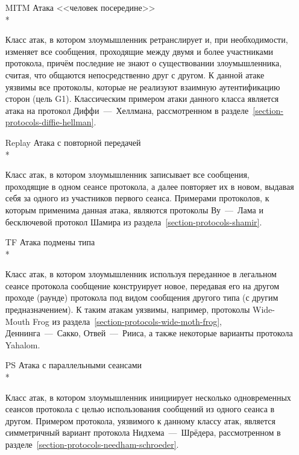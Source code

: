 \begin{itemize}
    \item[MITM] Атака <<человек посередине>>\\*
    \item[{}] Класс атак, в котором злоумышленник ретранслирует и, при необходимости, изменяет все сообщения, проходящие между двумя и более участниками протокола, причём последние не знают о существовании злоумышленника, считая, что общаются непосредственно друг с другом. К данной атаке уязвимы все протоколы, которые не реализуют взаимную аутентификацию сторон (цель G1). Классическим примером атаки данного класса является атака на протокол Диффи~---~Хеллмана, рассмотренном в разделе~\ref{section-protocols-diffie-hellman}.

    \item[Replay] Атака с повторной передачей\\*
    \item[{}] Класс атак, в котором злоумышленник записывает все сообщения, проходящие в одном сеансе протокола, а далее повторяет их в новом, выдавая себя за одного из участников первого сеанса. Примерами протоколов, к которым применима данная атака, являются протоколы Ву~---~Лама и бесключевой протокол Шамира из раздела~\ref{section-protocols-shamir}.

    \item[TF] Атака подмены типа\\*
    \item[{}] Класс атак, в котором злоумышленник используя переданное в легальном сеансе протокола сообщение конструирует новое, передавая его на другом проходе (раунде) протокола под видом сообщения другого типа (с другим предназначением). К таким атакам уязвимы, например, протоколы Wide-Mouth Frog из раздела~\ref{section-protocols-wide-moth-frog}, Деннинга~---~Сакко, Отвей~---~Рииса, а также некоторые варианты протокола Yahalom.

    \item[PS] Атака с параллельными сеансами\\*
    \item[{}] Класс атак, в котором злоумышленник инициирует несколько одновременных сеансов протокола с целью использования сообщений из одного сеанса в другом. Примером протокола, уязвимого к данному классу атак, является симметричный вариант протокола Нидхема~---~Шрёдера, рассмотренном в разделе~\ref{section-protocols-needham-schroeder}.


\end{itemize}
